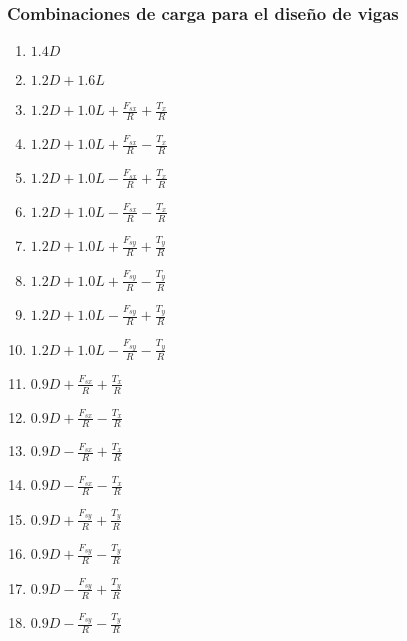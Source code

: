 \documentclass[12pt]{article}
\begin{document}
\subsubsection{Combinaciones de carga para el diseño de vigas}
\begin{multicols}{2}
\begin{enumerate}
    \item $1.4D$
    \item $1.2D+1.6L$
    \item $1.2D+1.0L+\frac{F_{sx}}{R}+\frac{T_{x}}{R}$
    \item $1.2D+1.0L+\frac{F_{sx}}{R}-\frac{T_{x}}{R}$
    \item $1.2D+1.0L-\frac{F_{sx}}{R}+\frac{T_{x}}{R}$
    \item $1.2D+1.0L-\frac{F_{sx}}{R}-\frac{T_{x}}{R}$
    \item $1.2D+1.0L+\frac{F_{sy}}{R}+\frac{T_{y}}{R}$
    \item $1.2D+1.0L+\frac{F_{sy}}{R}-\frac{T_{y}}{R}$
    \item $1.2D+1.0L-\frac{F_{sy}}{R}+\frac{T_{y}}{R}$
    \item $1.2D+1.0L-\frac{F_{sy}}{R}-\frac{T_{y}}{R}$
    \item $0.9D+\frac{F_{sx}}{R}+\frac{T_{x}}{R}$
    \item $0.9D+\frac{F_{sx}}{R}-\frac{T_{x}}{R}$
    \item $0.9D-\frac{F_{sx}}{R}+\frac{T_{x}}{R}$
    \item $0.9D-\frac{F_{sx}}{R}-\frac{T_{x}}{R}$
    \item $0.9D+\frac{F_{sy}}{R}+\frac{T_{y}}{R}$
    \item $0.9D+\frac{F_{sy}}{R}-\frac{T_{y}}{R}$
    \item $0.9D-\frac{F_{sy}}{R}+\frac{T_{y}}{R}$
    \item $0.9D-\frac{F_{sy}}{R}-\frac{T_{y}}{R}$
    
\end{enumerate}
\end{multicols}
\end{document}
